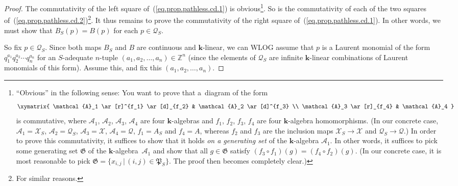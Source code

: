 \begin{proof}The commutativity of the left square of~(\ref{eq.prop.pathless.cd.1}) is obvious\footnote{``Obvious'' in the following sense: You want to prove that a~diagram of the form
\begin{gather*}
\xymatrix{
\mathcal{A}_1 \ar[r]^{f_1} \ar[d]_{f_2} & \mathcal{A}_2 \ar[d]^{f_3} \\
\mathcal{A}_3 \ar[r]_{f_4} & \mathcal{A}_4
}
\end{gather*}
is commutative, where $\mathcal{A}_{1}$, $\mathcal{A}_{2}$, $\mathcal{A}_{3}$, $\mathcal{A}_{4}$ are four $\mathbf{k}$-algebras and $f_{1}$, $f_{2}$, $f_{3}$, $f_{4}$ are four $\mathbf{k}$-algebra homomorphisms. (In our concrete case, $\mathcal{A}_{1}=\mathcal{X}_{S}$, $\mathcal{A}_{2}=\mathcal{Q}_{S}$, $\mathcal{A}_{3}=\mathcal{X}$, $\mathcal{A}_{4}=\mathcal{Q}$, $f_{1}=A_{S}$ and $f_{4}=A$, whereas $f_{2}$ and $f_{3}$ are the inclusion maps $\mathcal{X}_{S}\rightarrow\mathcal{X}$ and $\mathcal{Q}_{S}\rightarrow \mathcal{Q}$.) In order to prove this commutativity, it suffices to show that it holds \textit{on a generating set} of the $\mathbf{k}$-algebra
$\mathcal{A}_{1}$. In other words, it suffices to pick some generating set $\mathfrak{G}$ of the $\mathbf{k}$-algebra~$\mathcal{A}_{1}$ and show that all $g\in\mathfrak{G}$ satisfy $( f_{3}\circ f_{1}) ( g)= ( f_{4}\circ f_{2} ) ( g ) $. (In our concrete case, it is most reasonable to pick $\mathfrak{G}= \{ x_{i,j}\,|\, (i,j ) \in\mathfrak{P}_{S} \} $. The proof then becomes completely clear.)}. So is the commutativity of each of the two squares of~(\ref{eq.prop.pathless.cd.2})\footnote{For similar reasons.}. It thus remains to prove the commutativity of the right square of~(\ref{eq.prop.pathless.cd.1}). In other words, we must show that $B_{S}(p) =B(p) $ for each $p\in\mathcal{Q}_{S}$.

So fix $p\in\mathcal{Q}_{S}$. Since both maps $B_{S}$ and $B$ are continuous and $\mathbf{k}$-linear, we can WLOG assume that $p$ is a Laurent monomial of the form $q_{1}^{a_{1}}q_{2}^{a_{2}}\cdots q_{n}^{a_{n}}$ for an $S$-adequate $n$-tuple $( a_{1},a_{2},\ldots,a_{n}) \in\mathbb{Z}^{n}$ (since the elements of $\mathcal{Q}_{S}$ are infinite $\mathbf{k}$-linear combinations of Laurent monomials of this form). Assume this, and fix this
$ ( a_{1},a_{2},\ldots,a_{n} ) $.


\end{proof}
